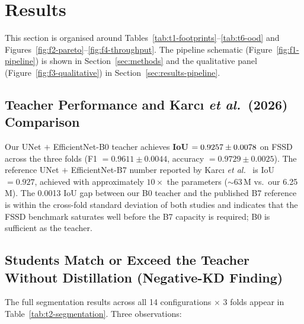 
\section{Results}
\label{sec:results}

This section is organised around Tables~\ref{tab:t1-footprints}--\ref{tab:t6-ood} and Figures~\ref{fig:f2-pareto}--\ref{fig:f4-throughput}. The pipeline schematic (Figure~\ref{fig:f1-pipeline}) is shown in Section~\ref{sec:methods} and the qualitative panel (Figure~\ref{fig:f3-qualitative}) in Section~\ref{sec:results-pipeline}.

\subsection{Teacher Performance and Karc{\i} \emph{et al.}~(2026) Comparison}
\label{sec:results-teacher}

Our UNet $+$ EfficientNet-B0 teacher achieves \textbf{IoU $= 0.9257 \pm 0.0078$} on FSSD across the three folds (F1 $= 0.9611 \pm 0.0044$, accuracy $= 0.9729 \pm 0.0025$). The reference UNet $+$ EfficientNet-B7 number reported by Karc{\i} \emph{et al.}~\cite{karci2026deep} is IoU $= 0.927$, achieved with approximately $10\times$ the parameters ($\sim 63$\,M vs.~our 6.25\,M). The 0.0013 IoU gap between our B0 teacher and the published B7 reference is within the cross-fold standard deviation of both studies and indicates that the FSSD benchmark saturates well before the B7 capacity is required; B0 is sufficient as the teacher.

\subsection{Students Match or Exceed the Teacher Without Distillation (Negative-KD Finding)}
\label{sec:results-kd}

The full segmentation results across all 14 configurations $\times$ 3 folds appear in Table~\ref{tab:t2-segmentation}. Three observations:




